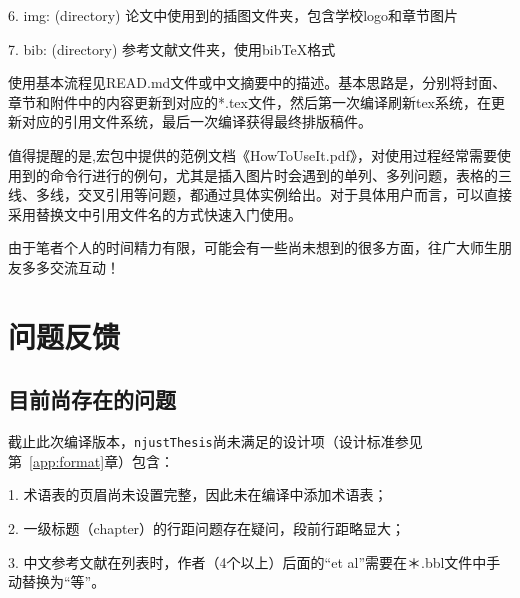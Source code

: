 6. img: (directory) 论文中使用到的插图文件夹，包含学校logo和章节图片

7. bib: (directory) 参考文献文件夹，使用bibTeX格式

使用基本流程见READ.md文件或中文摘要中的描述。基本思路是，分别将封面、章节和附件中的内容更新到对应的*.tex文件，然后第一次编译刷新tex系统，在更新对应的引用文件系统，最后一次编译获得最终排版稿件。

值得提醒的是,宏包中提供的范例文档《HowToUseIt.pdf》，对使用过程经常需要使用到的命令行进行的例句，尤其是插入图片时会遇到的单列、多列问题，表格的三线、多线，交叉引用等问题，都通过具体实例给出。对于具体用户而言，可以直接采用替换文中引用文件名的方式快速入门使用。

由于笔者个人的时间精力有限，可能会有一些尚未想到的很多方面，往广大师生朋友多多交流互动！

\section{问题反馈}
\label{sec:FandQ}

\subsection{目前尚存在的问题}
\label{sec:remainingProblem}
截止此次编译版本，\texttt{njustThesis}尚未满足的设计项（设计标准参见第~\ref{app:format}章）包含：

1. 术语表的页眉尚未设置完整，因此未在编译中添加术语表；

2. 一级标题（chapter）的行距问题存在疑问，段前行距略显大；

3. 中文参考文献在列表时，作者（4个以上）后面的“et al”需要在＊.bbl文件中手动替换为“等”。


